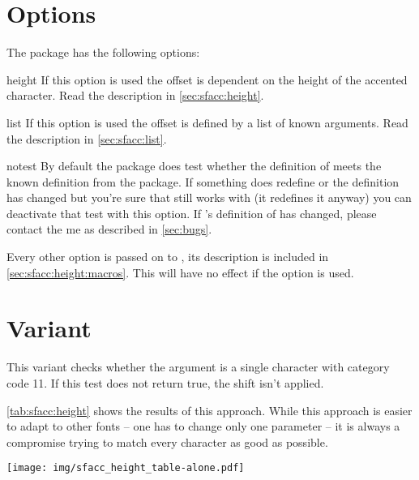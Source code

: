 \section{Options}%
The package has the following options:
\begin{describeopt}{height}
  If this option is used the offset is dependent on the height of the accented
  character. Read the description in \autoref{sec:sfacc:height}.
\end{describeopt}
\begin{describeopt}{list}
  If this option is used the offset is defined by a list of known arguments.
  Read the description in \autoref{sec:sfacc:list}.
\end{describeopt}
\begin{describeopt}{notest}
  By default the package does test whether the definition of 
  meets the known definition from the  package. If something does
  redefine  or the definition has changed but you're sure that
   still works with (it redefines it anyway) you can deactivate
  that test with this option. If 's definition of 
  has changed, please contact the me as described in \autoref{sec:bugs}.
\end{describeopt}

Every other option is passed on to , its description is included
in \autoref{sec:sfacc:height:macros}. This will have no effect if the 
option is used.

\section{ Variant}\label{sec:sfacc:height}%
This variant checks whether the argument is a single character with category
code 11. If this test does not return true, the shift isn't applied.

\autoref{tab:sfacc:height} shows the results of this approach. While this
approach is easier to adapt to other fonts -- one has to change only one
parameter -- it is always a compromise trying to match every character as good
as possible.

\begin{MRTtable}%
  [
    ,env={}
    ,label=tab:sfacc:height
    ,caption=
      {%
        Comparison of shifted accents against original placement with the use of
        the \opt{height} variant.%
      }
  ]
  \texttt{[image: img/sfacc\_height\_table-alone.pdf]}
\end{MRTtable}%

